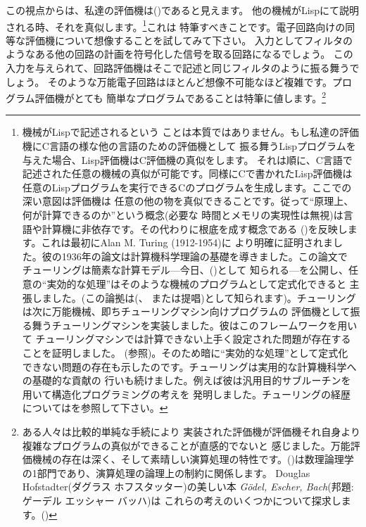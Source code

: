 \noindent
この視点からは、私達の評価機は()であると見えます。
他の機械がLispにて説明される時、それを真似します。\footnote{機械がLispで記述されるという
ことは本質ではありません。もし私達の評価機にC言語の様な他の言語のための評価機として
振る舞うLispプログラムを与えた場合、Lisp評価機はC評価機の真似をします。
それは順に、C言語で記述された任意の機械の真似が可能です。同様にCで書かれたLisp評価機は
任意のLispプログラムを実行できるCのプログラムを生成します。ここでの深い意図は評価機は
任意の他の物を真似できることです。従って``原理上、何が計算できるのか''という概念(必要な
時間とメモリの実現性は無視)は言語や計算機に非依存です。その代わりに根底を成す概念である
()を反映します。これは最初にAlan M. Turing (1912-1954)に
より明確に証明されました。彼の1936年の論文は計算機科学理論の基礎を導きました。この論文で
チューリングは簡素な計算モデル---今日、()として
知られる---を公開し、任意の``実効的な処理''はそのような機械のプログラムとして定式化できると
主張しました。(この論拠は(、
または提唱)として知られます)。チューリングは次に万能機械、即ちチューリングマシン向けプログラムの
評価機として振る舞うチューリングマシンを実装しました。彼はこのフレームワークを用いて
チューリングマシンでは計算できない上手く設定された問題が存在することを証明しました。
(参照)。そのため暗に``実効的な処理''として定式化
できない問題の存在も示したのです。チューリングは実用的な計算機科学への基礎的な貢献の
行いも続けました。例えば彼は汎用目的サブルーチンを用いて構造化プログラミングの考えを
発明しました。チューリングの経歴についてはを参照して下さい。}これは
特筆すべきことです。電子回路向けの同等な評価機について想像することを試してみて下さい。
入力としてフィルタのようなある他の回路の計画を符号化した信号を取る回路になるでしょう。
この入力を与えられて、回路評価機はそこで記述と同じフィルタのように振る舞うでしょう。
そのような万能電子回路はほとんど想像不可能なほど複雑です。プログラム評価機がとても
簡単なプログラムであることは特筆に値します。\footnote{ある人々は比較的単純な手続により
実装された評価機が評価機それ自身より複雑なプログラムの真似ができることが直感的でないと
感じました。万能評価機械の存在は深く、そして素晴しい演算処理の特性です。()は数理論理学の1部門であり、演算処理の論理上の制約に関係します。
Douglas Hofstadter(ダグラス ホフスタッター)の美しい本
\textit{G\"odel, Escher, Bach}(邦題:ゲーデル エッシャー バッハ)は
これらの考えのいくつかについて探求します。()}

